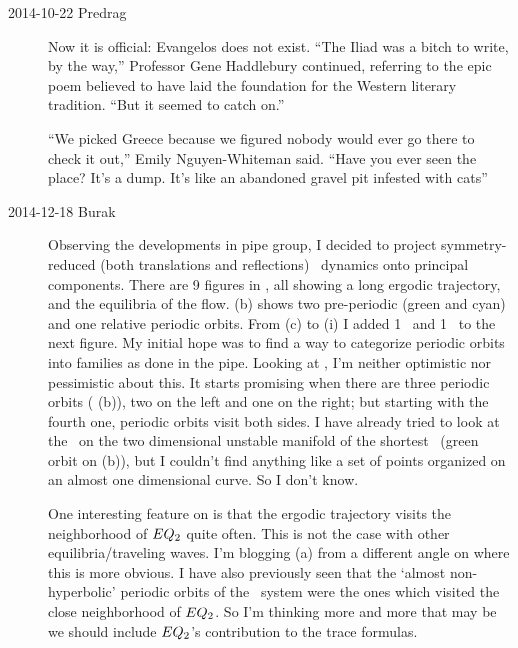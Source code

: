 \begin{description}
\item[2014-10-22 Predrag]
Now it is official:
{Evangelos} does not exist. ``The Iliad was a bitch to write, by the way,''
Professor Gene Haddlebury continued, referring to the epic poem believed
to have laid the foundation for the Western literary tradition. ``But it
seemed to catch on.''

``We picked Greece because we figured nobody would ever go there to check
it out,'' Emily Nguyen-Whiteman said. ``Have you ever seen the place?
It's a dump. It's like an abandoned gravel pit infested with cats''

\item[2014-12-18 Burak]
Observing the developments in pipe group, I decided to project
symmetry-reduced (both translations and reflections) \KS\ dynamics onto
principal components. There are 9 figures in , all
showing a long ergodic trajectory, and the equilibria of the flow.
 (b) shows two pre-periodic (green and cyan) and one
relative periodic orbits. From (c) to (i) I added 1 \ppo\ and 1 \rpo\ to the
next figure. My initial hope was to find a way to categorize periodic
orbits into families as done in the pipe. Looking at ,
I'm neither optimistic nor pessimistic about this. It starts promising when
there are three periodic orbits ( (b)), two on the left
and one on the right; but starting with the fourth one, periodic orbits
visit both sides. I have already tried to look at the \PoincSec\ on
the two dimensional unstable manifold of the shortest \ppo\ (green orbit on
 (b)), but I couldn't find anything like a set of points
organized on an almost one dimensional curve. So I don't know.

One interesting feature on  is that the ergodic
trajectory visits the neighborhood of $EQ_{2}$ quite often. This is not the
case with other equilibria/traveling waves. I'm blogging
 (a) from a different angle on  where
this is more obvious. I have also previously seen that the `almost
non-hyperbolic' periodic orbits of the \KS\ system were the ones which
visited the close neighborhood of $EQ_{2}$. So I'm thinking more and more
that may be we should include $EQ_{2}$'s contribution to the trace formulas.


\end{description}

